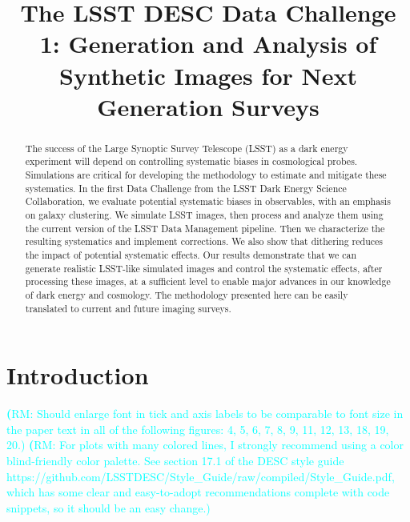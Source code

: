 \documentclass[twocolumn]{aastex62}
\newcommand{\rachel}[1]{{\textcolor{cyan}{{\textbf (RM: #1)}}}}
\begin{document}
\title[LSST DESC DC1]{The LSST DESC Data Challenge 1: Generation and Analysis of Synthetic Images for Next Generation Surveys }


\begin{abstract}

The success of the Large Synoptic Survey Telescope (LSST) as a dark energy experiment will depend on controlling systematic biases in cosmological probes. Simulations are critical for developing the methodology to estimate and mitigate these systematics. In the first Data Challenge from the LSST Dark Energy Science Collaboration, we evaluate potential systematic biases in observables, with an emphasis on galaxy clustering. We simulate LSST images, then process and analyze them using the current version of the LSST Data Management pipeline. Then we characterize the resulting systematics and implement corrections. We also show that dithering reduces the impact of potential systematic effects. Our results demonstrate that we can generate realistic LSST-like simulated images and control the systematic effects, after processing these images, at a sufficient level to enable major advances in our knowledge of dark energy and cosmology. The methodology presented here can be easily translated to current and future imaging surveys.
\end{abstract}



%

\section{Introduction}
\label{sec:intro}
\rachel{Should enlarge font in tick and axis labels to be comparable to font size in the paper
  text in all of the following figures: 4, 5, 6, 7, 8, 9, 11, 12, 13, 18, 19, 20.}
\rachel{For plots with many colored lines, I strongly recommend using a color blind-friendly color palette.  See section 17.1 of the DESC style guide https://github.com/LSSTDESC/Style\_Guide/raw/compiled/Style\_Guide.pdf, which has some clear and easy-to-adopt recommendations complete with code snippets, so it should be an easy change.}
\end{document}
